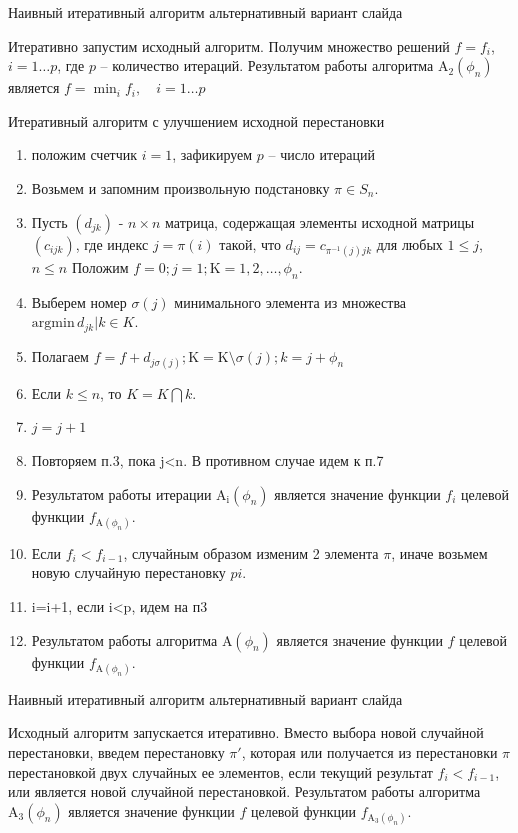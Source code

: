 \documentclass[12pt]{beamer}
\newcommand\Fontvi{\fontsize{8}{7.2}\selectfont}
\begin{document}
\begin{frame}{Наивный итеративный алгоритм}
альтернативный вариант слайда

Итеративно запустим исходный алгоритм.
Получим множество решений $f = {f_i}$, $i = 1 \ldots p$, где $p$ -- количество итераций. 
Результатом работы алгоритма $\mathrm{A_2}(\phi_n)$ является $f=\min_{i} {f_i}, \quad i=1 \ldots p$ 
\end{frame}



\begin{frame}{Итеративный алгоритм с улучшением исходной перестановки} 
\Fontvi
\begin{enumerate}
\item положим счетчик $i=1$, зафикируем $p$ -- число итераций
\item Возьмем и запомним произвольную подстановку $\pi \in S_n$. 
\item Пусть $(d_{jk})$ - $n \times n$ 
матрица, содержащая элементы исходной матрицы $(c_{ijk})$, где индекс $j=\pi(i)$ такой, что
$d_{ij} = c_{\pi^{-1}(j)jk}$ для любых $1 \leq j$,$n \leq n$
Положим $f = 0 ; j =1 ; \mathrm{K}={1,2, \ldots , \phi_n}$. 
\item Выберем номер $\sigma(j)$ минимального элемента из множества $\mathrm{argmin} \, {d_{jk} | k \in K}$.
\item Полагаем $f = f + d_{j \sigma (j)} ; \mathrm{K} = \mathrm{K}  \setminus  {\sigma(j)} ; k=j+\phi_n$
\item Если $k \leq n $, то $K = K \bigcap {k}$.
\item $j = j + 1$
\item Повторяем п.3, пока j<n. В противном случае идем к п.7
\item Результатом работы итерации  $\mathrm{A_i}(\phi_n)$ является значение функции $f_i$ целевой функции   
$f_{\mathrm{A}(\phi_n)}$. 
\item Если $f_i < f_{i-1}$, случайным образом изменим 2 элемента $\pi$, иначе возьмем новую случайную  перестановку $pi$.
\item i=i+1, если i<p, идем на п3
\item Результатом работы алгоритма $\mathrm{A}(\phi_n)$ является значение функции $f$ целевой функции   
$f_{\mathrm{A}(\phi_n)}$. 
\end{enumerate}
\end{frame}

\begin{frame}{Наивный итеративный алгоритм}
альтернативный вариант слайда

Исходный алгоритм запускается итеративно. 
Вместо выбора новой случайной перестановки, введем перестановку $\pi'$, которая или получается из перестановки $\pi$ 
перестановкой двух случайных ее элементов, если текущий результат $f_i < f_{i-1}$, или является новой случайной перестановкой. 
Результатом работы алгоритма $\mathrm{A_3}(\phi_n)$ является значение функции $f$ целевой функции   
$f_{\mathrm{A_3}(\phi_n)}$. 

\end{frame}
\end{document}
